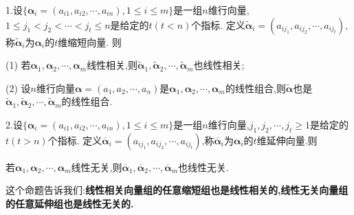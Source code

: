 \documentclass[lang=cn,newtx,10pt,scheme=chinese]{elegantbook}
\begin{document}
\begin{proposition}[缩短向量与延伸向量]\label{proposition:线性相关向量组的缩短组也线性相关}
1.设\(\{\boldsymbol{\alpha}_i=(a_{i1},a_{i2},\cdots,a_{in}),1\leq i\leq m\}\)是一组\(n\)维行向量,\(1\leq j_1<j_2<\cdots<j_t\leq n\)是给定的\(t(t < n)\)个指标. 定义\(\widetilde{\boldsymbol{\alpha}}_i=(a_{ij_1},a_{ij_2},\cdots,a_{ij_t})\),称\(\widetilde{\boldsymbol{\alpha}}_i\)为\(\boldsymbol{\alpha}_i\)的\(t\)维缩短向量. 则

(1) 若\(\boldsymbol{\alpha}_1,\boldsymbol{\alpha}_2,\cdots,\boldsymbol{\alpha}_m\)线性相关,则\(\widetilde{\boldsymbol{\alpha}}_1,\widetilde{\boldsymbol{\alpha}}_2,\cdots,\widetilde{\boldsymbol{\alpha}}_m\)也线性相关;

(2) 设\(n\)维行向量\(\boldsymbol{\alpha}=(a_1,a_2,\cdots,a_n)\)是\(\boldsymbol{\alpha}_1,\boldsymbol{\alpha}_2,\cdots,\boldsymbol{\alpha}_m\)的线性组合,则\(\widetilde{\boldsymbol{\alpha}}\)也是\(\widetilde{\boldsymbol{\alpha}}_1,\widetilde{\boldsymbol{\alpha}}_2,\cdots,\widetilde{\boldsymbol{\alpha}}_m\)的线性组合.

2.设\(\{\boldsymbol{\alpha}_i=(a_{i1},a_{i2},\cdots,a_{in}),1\leq i\leq m\}\)是一组\(n\)维行向量,\(j_1,j_2,\cdots,j_t\geq 1\)是给定的\(t(t > n)\)个指标. 定义\(\overline{\boldsymbol{\alpha}}_i=(a_{ij_1},a_{ij_2},\cdots,a_{ij_t})\),称\(\overline{\boldsymbol{\alpha}}_i\)为\(\boldsymbol{\alpha}_i\)的\(t\)维延伸向量.则

若\(\boldsymbol{\alpha}_1,\boldsymbol{\alpha}_2,\cdots,\boldsymbol{\alpha}_m\)线性无关,则\(\overline{\boldsymbol{\alpha}}_1,\overline{\boldsymbol{\alpha}}_2,\cdots,\overline{\boldsymbol{\alpha}}_m\)也线性无关.
\end{proposition}
\begin{note}
这个命题告诉我们:\textbf{线性相关向量组的任意缩短组也是线性相关的,线性无关向量组的任意延伸组也是线性无关的.}
\end{note}
\end{document}
